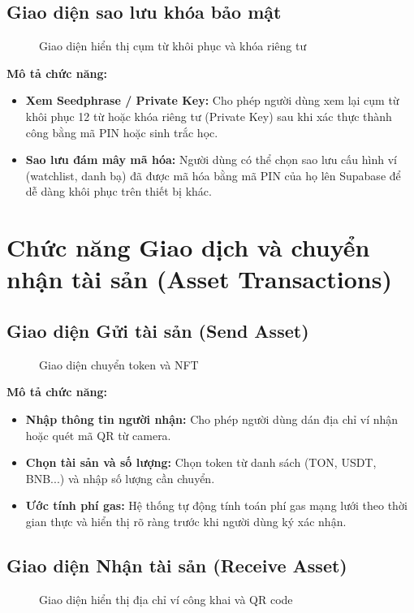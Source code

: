 \documentclass[a4paper]{report}
\begin{document}
\subsection{Giao diện sao lưu khóa bảo mật}
\begin{figure}[h]
    \centering
    \caption{Giao diện hiển thị cụm từ khôi phục và khóa riêng tư}
    \label{fig:ui_backup}
\end{figure}

\textbf{Mô tả chức năng:}
\begin{itemize}
    \item \textbf{Xem Seedphrase / Private Key:} Cho phép người dùng xem lại cụm từ khôi phục 12 từ hoặc khóa riêng tư (Private Key) sau khi xác thực thành công bằng mã PIN hoặc sinh trắc học.
    \item \textbf{Sao lưu đám mây mã hóa:} Người dùng có thể chọn sao lưu cấu hình ví (watchlist, danh bạ) đã được mã hóa bằng mã PIN của họ lên Supabase để dễ dàng khôi phục trên thiết bị khác.
\end{itemize}

\section{Chức năng Giao dịch và chuyển nhận tài sản (Asset Transactions)}

\subsection{Giao diện Gửi tài sản (Send Asset)}
\begin{figure}[h]
    \centering
    \caption{Giao diện chuyển token và NFT}
    \label{fig:ui_send}
\end{figure}

\textbf{Mô tả chức năng:}
\begin{itemize}
    \item \textbf{Nhập thông tin người nhận:} Cho phép người dùng dán địa chỉ ví nhận hoặc quét mã QR từ camera.
    \item \textbf{Chọn tài sản và số lượng:} Chọn token từ danh sách (TON, USDT, BNB...) và nhập số lượng cần chuyển.
    \item \textbf{Ước tính phí gas:} Hệ thống tự động tính toán phí gas mạng lưới theo thời gian thực và hiển thị rõ ràng trước khi người dùng ký xác nhận.
\end{itemize}

\subsection{Giao diện Nhận tài sản (Receive Asset)}
\begin{figure}[h]
    \centering
    \caption{Giao diện hiển thị địa chỉ ví công khai và QR code}
    \label{fig:ui_receive}
\end{figure}
\end{document}
